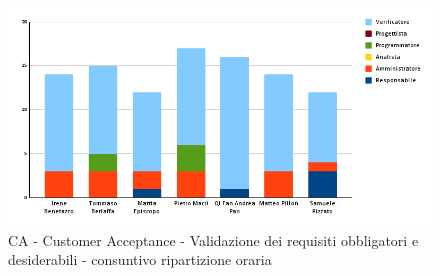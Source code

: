 \begin{figure}[H]
    \centering\includegraphics[width=\textwidth, height=\textheight,keepaspectratio]{images/consuntivo/CA-validazione-dei-requisiti-obbligatori-e-desiderabili-orario.png}
    \caption{CA - Customer Acceptance - Validazione dei requisiti obbligatori e desiderabili - consuntivo ripartizione oraria}
\end{figure}

